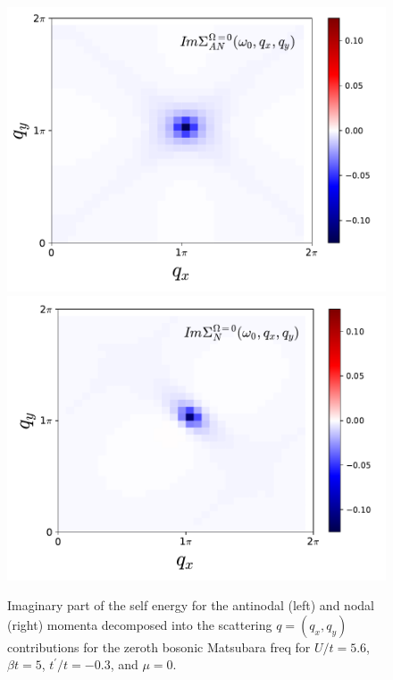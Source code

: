 \documentclass[twocolumn,notitlepage,prb,superscriptaddress,showpacs]{revtex4-1}
\begin{document}
\begin{figure}
\centering
    \includegraphics[width=0.68\linewidth]{c_mu_0_sigma_AN_nu1.pdf}
    \includegraphics[width=0.68\linewidth]{c_mu_0_sigma_node_nu1.pdf}
\caption{ Imaginary part of the self energy for the antinodal (left) and nodal (right) momenta decomposed into the scattering $q=(q_x,q_y)$ contributions for the zeroth bosonic Matsubara freq for $U/t=5.6$, $\beta t =5$, $t^\prime /t=-0.3$, and $\mu=0$.\label{fig:qxqyomega0} }
\end{figure} 
\end{document}
